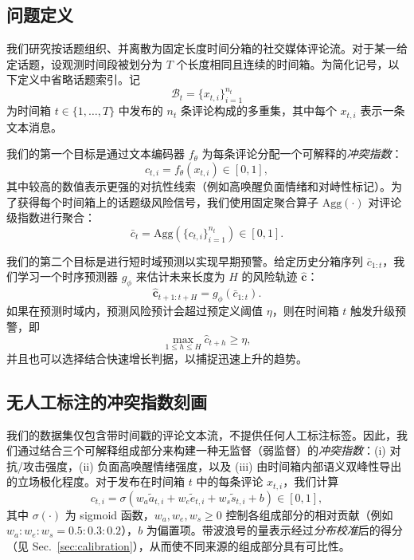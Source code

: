 \documentclass[conference]{IEEEtran}
\begin{document}
\subsection{问题定义}

我们研究按话题组织、并离散为固定长度时间分箱的社交媒体评论流。对于某一给定话题，设观测时间段被划分为 $T$ 个长度相同且连续的时间箱。为简化记号，以下定义中省略话题索引。记
\[
\mathcal{B}_t = \{x_{t,i}\}_{i=1}^{n_t}
\]
为时间箱 $t \in \{1, \dots, T\}$ 中发布的 $n_t$ 条评论构成的多重集，其中每个 $x_{t,i}$ 表示一条文本消息。

我们的第一个目标是通过文本编码器 $f_\theta$ 为每条评论分配一个可解释的\emph{冲突指数}：
\begin{equation}
c_{t,i} = f_\theta(x_{t,i}) \in [0, 1],
\end{equation}
其中较高的数值表示更强的对抗性线索（例如高唤醒负面情绪和对峙性标记）。为了获得每个时间箱上的话题级风险信号，我们使用固定聚合算子 $\mathrm{Agg}(\cdot)$ 对评论级指数进行聚合：
\begin{equation}
\bar{c}_t = \mathrm{Agg}\left(\{c_{t,i}\}_{i=1}^{n_t}\right) \in [0, 1].
\end{equation}

我们的第二个目标是进行短时域预测以实现早期预警。给定历史分箱序列 $\bar{c}_{1:t}$，我们学习一个时序预测器 $g_\phi$ 来估计未来长度为 $H$ 的风险轨迹 $\mathbf{\hat{c}}$：
\begin{equation}
\mathbf{\hat{c}}_{t+1:t+H} = g_\phi(\bar{c}_{1:t}).
\end{equation}
如果在预测时域内，预测风险预计会超过预定义阈值 $\eta$，则在时间箱 $t$ 触发升级预警，即
\begin{equation}
\max_{1 \le h \le H} \hat{c}_{t+h} \ge \eta,
\end{equation}
并且也可以选择结合快速增长判据，以捕捉迅速上升的趋势。

\subsection{无人工标注的冲突指数刻画}\label{sec:conflict_index}

我们的数据集仅包含带时间戳的评论文本流，不提供任何人工标注标签。因此，我们通过结合三个可解释组成部分来构建一种无监督（弱监督）的\emph{冲突指数}：(i) 对抗/攻击强度，(ii) 负面高唤醒情绪强度，以及 (iii) 由时间箱内部语义双峰性导出的立场极化程度。对于发布在时间箱 $t$ 中的每条评论 $x_{t,i}$，我们计算
\begin{equation}
c_{t,i} = \sigma\!\left(w_a \tilde{a}_{t,i} + w_e \tilde{e}_{t,i} + w_s \tilde{s}_{t,i} + b\right)\in[0,1],
\label{eq:conflict_index_fusion}
\end{equation}
其中 $\sigma(\cdot)$ 为 sigmoid 函数，$w_a,w_e,w_s \ge 0$ 控制各组成部分的相对贡献（例如 $w_a:w_e:w_s = 0.5:0.3:0.2$），$b$ 为偏置项。带波浪号的量表示经过\emph{分布校准}后的得分（见 Sec.~\ref{sec:calibration}），从而使不同来源的组成部分具有可比性。
\end{document}
